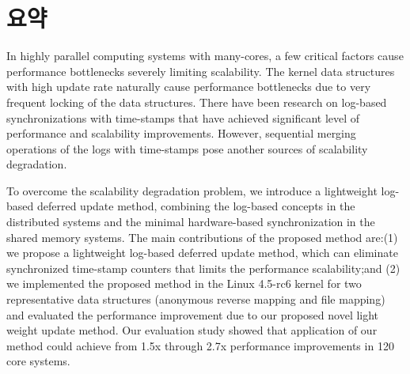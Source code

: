 \documentclass[doctor,korean,final]{kmu}
\begin{document}



\chapter{요약}
In highly parallel computing systems with many-cores, a few critical 
factors cause performance bottlenecks severely limiting scalability.
The kernel data structures with high update rate naturally cause 
performance bottlenecks due to very frequent locking of the data structures. 
There have been research on log-based synchronizations with time-stamps
that have achieved significant level of performance and scalability 
improvements. However, sequential merging operations of the logs with 
time-stamps pose another sources of scalability degradation.

To overcome the scalability degradation problem, we introduce a lightweight log-based deferred update
method, combining the log-based concepts in the distributed systems and the
minimal hardware-based synchronization in the shared memory systems.
The main contributions of the proposed method are:(1) we propose a lightweight
log-based deferred update method, which can eliminate synchronized time-stamp counters that limits the performance scalability;and 
(2) we implemented the proposed method in the Linux 4.5-rc6 kernel
for two representative data structures (anonymous reverse mapping and 
file mapping) and evaluated the performance improvement due to our
proposed novel light weight update method. 
Our evaluation study showed that application of our method could
achieve from 1.5x through 2.7x performance improvements in 120 core
systems.


\newif\ifkor
\kortrue 
\end{document}
